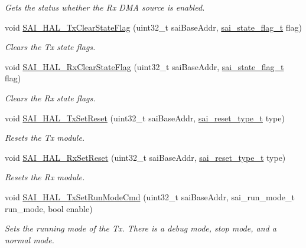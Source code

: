 \begin{DoxyCompactItemize}
\begin{DoxyCompactList}\small\item\em Gets the status whether the Rx D\+MA source is enabled. \end{DoxyCompactList}\item 
void \hyperlink{group__sai__hal_gaebfafcaec126e5c69f5feaf8958e5ca6}{S\+A\+I\+\_\+\+H\+A\+L\+\_\+\+Tx\+Clear\+State\+Flag} (uint32\+\_\+t sai\+Base\+Addr, \hyperlink{group__sai__hal_gafe5a7889b1a42b3e54be7cad3091a5ee}{sai\+\_\+state\+\_\+flag\+\_\+t} flag)
\begin{DoxyCompactList}\small\item\em Clears the Tx state flags. \end{DoxyCompactList}\item 
void \hyperlink{group__sai__hal_gadab16a7a29f0caa9e50255d9bbba1b75}{S\+A\+I\+\_\+\+H\+A\+L\+\_\+\+Rx\+Clear\+State\+Flag} (uint32\+\_\+t sai\+Base\+Addr, \hyperlink{group__sai__hal_gafe5a7889b1a42b3e54be7cad3091a5ee}{sai\+\_\+state\+\_\+flag\+\_\+t} flag)
\begin{DoxyCompactList}\small\item\em Clears the Rx state flags. \end{DoxyCompactList}\item 
void \hyperlink{group__sai__hal_gaca8049d11b159adad5b480098014fe29}{S\+A\+I\+\_\+\+H\+A\+L\+\_\+\+Tx\+Set\+Reset} (uint32\+\_\+t sai\+Base\+Addr, \hyperlink{group__sai__hal_gaca36f65012b1a99022d1bc02be2d33c5}{sai\+\_\+reset\+\_\+type\+\_\+t} type)
\begin{DoxyCompactList}\small\item\em Resets the Tx module. \end{DoxyCompactList}\item 
void \hyperlink{group__sai__hal_ga8aaa72d3b8b9556f1fd77675f01d01fe}{S\+A\+I\+\_\+\+H\+A\+L\+\_\+\+Rx\+Set\+Reset} (uint32\+\_\+t sai\+Base\+Addr, \hyperlink{group__sai__hal_gaca36f65012b1a99022d1bc02be2d33c5}{sai\+\_\+reset\+\_\+type\+\_\+t} type)
\begin{DoxyCompactList}\small\item\em Resets the Rx module. \end{DoxyCompactList}\item 
void \hyperlink{group__sai__hal_gaf280cab40954dc387d929235977a1c56}{S\+A\+I\+\_\+\+H\+A\+L\+\_\+\+Tx\+Set\+Run\+Mode\+Cmd} (uint32\+\_\+t sai\+Base\+Addr, sai\+\_\+run\+\_\+mode\+\_\+t run\+\_\+mode, bool enable)
\begin{DoxyCompactList}\small\item\em Sets the running mode of the Tx. There is a debug mode, stop mode, and a normal mode. \end{DoxyCompactList}\item 

\end{DoxyCompactItemize}
